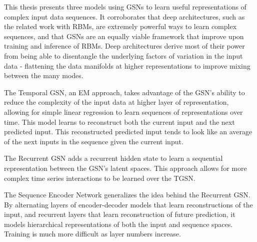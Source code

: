 This thesis presents three models using GSNs to learn useful representations of complex input data sequences. It corroborates that deep architectures, such as the related work with RBMs, are extremely powerful ways to learn complex sequences, and that GSNs are an equally viable framework that improve upon training and inference of RBMs. Deep architectures derive most of their power from being able to disentangle the underlying factors of variation in the input data - flattening the data manifolds at higher representations to improve mixing between the many modes.

The Temporal GSN, an EM approach, takes advantage of the GSN's ability to reduce the complexity of the input data at higher layer of representation, allowing for simple linear regression to learn sequences of representations over time. This model learns to reconstruct both the current input and the next predicted input. This reconstructed predicted input tends to look like an average of the next inputs in the sequence given the current input.

The Recurrent GSN adds a recurrent hidden state to learn a sequential representation between the GSN's latent spaces. This approach allows for more complex time series interactions to be learned over the TGSN.

The Sequence Encoder Network generalizes the idea behind the Recurrent GSN. By alternating layers of encoder-decoder models that learn reconstructions of the input, and recurrent layers that learn reconstruction of future prediction, it models hierarchical representations of both the input and sequence spaces. Training is much more difficult as layer numbers increase.
